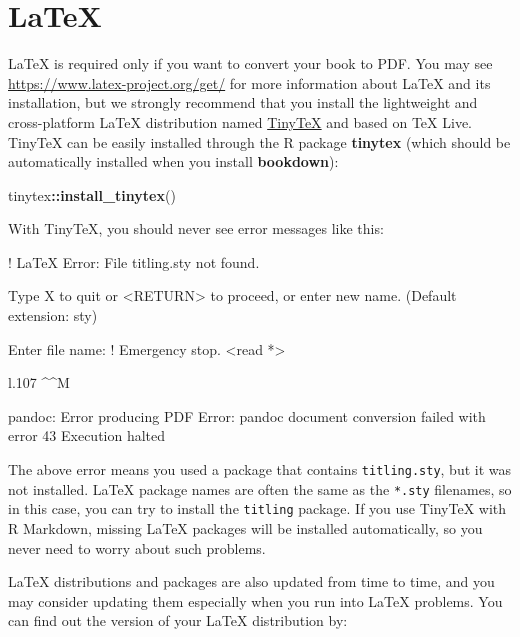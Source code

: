 \documentclass[
  12pt,
]{book}
\newenvironment{Shaded}{\begin{snugshade}}{\end{snugshade}}
\newcommand{\KeywordTok}[1]{\textcolor[rgb]{0.13,0.29,0.53}{\textbf{#1}}}
\newcommand{\NormalTok}[1]{#1}
\newcommand{\OperatorTok}[1]{\textcolor[rgb]{0.81,0.36,0.00}{\textbf{#1}}}
\begin{document}
\hypertarget{latex}{%
\section{LaTeX}\label{latex}}

LaTeX is required only if you want to convert your book to PDF. You may see \url{https://www.latex-project.org/get/} for more information about LaTeX and its installation, but we strongly recommend that you install the lightweight and cross-platform LaTeX distribution named \href{https://yihui.org/tinytex/}{TinyTeX} and based on TeX Live. TinyTeX can be easily installed through the R package \textbf{tinytex} (which should be automatically installed when you install \textbf{bookdown}):

\begin{Shaded}
\begin{Highlighting}[]
\NormalTok{tinytex}\OperatorTok{::}\KeywordTok{install\_tinytex}\NormalTok{()}
\end{Highlighting}
\end{Shaded}

With TinyTeX, you should never see error messages like this:

\begin{Shaded}
\begin{Highlighting}[]
\NormalTok{! LaTeX Error: File \textasciigrave{}titling.sty\textquotesingle{} not found.}

\NormalTok{Type X to quit or \textless{}RETURN\textgreater{} to proceed,}
\NormalTok{or enter new name. (Default extension: sty)}

\NormalTok{Enter file name:}
\NormalTok{! Emergency stop.}
\NormalTok{\textless{}read *\textgreater{}}

\NormalTok{l.107 \^{}\^{}M}

\NormalTok{pandoc: Error producing PDF}
\NormalTok{Error: pandoc document conversion failed with error 43}
\NormalTok{Execution halted}
\end{Highlighting}
\end{Shaded}

The above error means you used a package that contains \texttt{titling.sty}, but it was not installed. LaTeX package names are often the same as the \texttt{*.sty} filenames, so in this case, you can try to install the \texttt{titling} package. If you use TinyTeX with R Markdown, missing LaTeX packages will be installed automatically, so you never need to worry about such problems.

LaTeX distributions and packages are also updated from time to time, and you may consider updating them especially when you run into LaTeX problems. You can find out the version of your LaTeX distribution by:
\end{document}
